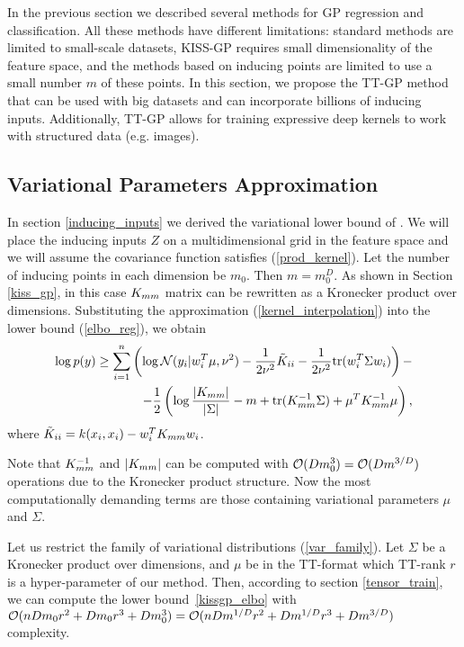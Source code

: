 In the previous section we described several methods for GP regression and
classification. All these methods have different limitations: standard methods
are limited to small-scale datasets, KISS-GP requires small dimensionality of
the feature space, and the methods based on inducing points are limited to use
a small number $m$ of these points. In this section, we propose the TT-GP method
that can be used with big datasets and can incorporate billions of inducing
inputs. Additionally, TT-GP allows for training expressive deep kernels to work
with structured data (e.g. images).

\subsection{Variational Parameters Approximation}
  In section \ref{inducing_inputs} we derived the variational lower bound of
  \citet{hensman2013}. We will place the inducing inputs $Z$ on a
  multidimensional grid in the feature space and we will assume the
  covariance function satisfies (\ref{prod_kernel}). Let the number
  of inducing points in each dimension be $m_0$. Then $m = m_0^D$.
  As shown in Section \ref{kiss_gp},
  in this case $K_{mm}$ matrix can be rewritten as a Kronecker product over
  dimensions. Substituting the approximation (\ref{kernel_interpolation}) into
  the lower bound (\ref{elbo_reg}), we obtain
  \begin{equation}
  \label{kissgp_elbo}
    \begin{split}
      \log p(y) \ge
      \sum_{i=1}^n \left ( \log \mathcal{N} (y_i | w_i^T \mu, \nu^2) -
        \frac 1 {2\nu^2} \tilde K_{ii} -
        \frac 1 {2\nu^2} \mbox{tr} (w_i^T \Sigma w_i)
      \right )-
      \\
      - \frac 1 2 \left(
        \log \frac {|K_{mm}|} {|\Sigma|} - m + \mbox{tr}(K_{mm}^{-1} \Sigma) +
        \mu^T K_{mm}^{-1} \mu
      \right),
    \end{split}
  \end{equation}
  where $\tilde K_{ii} = k(x_i, x_i) - w_i^T K_{mm} w_i$.

  Note that $K_{mm}^{-1}$ and $|K_{mm}|$ can be computed with
  $\mathcal{O}(D m_0^3) = \mathcal{O}(D m^{3/D})$ operations due to the
  Kronecker product structure. Now the most computationally demanding terms
  are those containing variational parameters $\mu$ and $\Sigma$.

  Let us restrict the family of variational distributions (\ref{var_family}). Let $\Sigma$ be
  a Kronecker product over dimensions, and $\mu$ be in the TT-format which TT-rank $r$
  is a hyper-parameter of our method. Then, according to section \ref{tensor_train}, we can
  compute the lower bound~\eqref{kissgp_elbo} with
  $\mathcal{O}(nDm_0 r^2 + D m_0 r^3 + Dm_0^3) =
  \mathcal{O}(nD m^{1/D} r^2 + D m^{1/D} r^3 + D m^{3/D})$ complexity.

